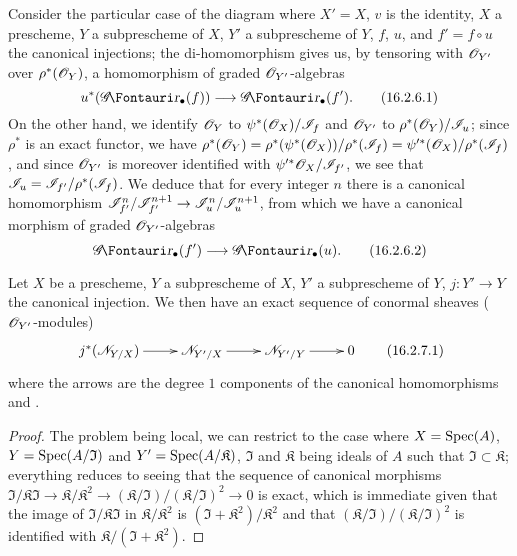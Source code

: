 \begin{env}[16.2.6]
\label{IV.16.2.6}
Consider the particular case of the diagram  where $X' = X$, $v$ is the identity, $X$ a prescheme, $Y$ a subprescheme of $X$, $Y'$ a subprescheme of $Y$, $f$, $u$, and $f' = f \circ u$ the canonical injections;
the di-homomorphism  gives us, by tensoring with $\mathscr{O}_{Y'}$ over $\rho^*(\mathscr{O}_Y)$, a homomorphism of graded $\mathscr{O}_{Y'}$-algebras
\[
  \label{IV.16.2.6.1}
  u^*(\shGr_\bullet(f)) \to \shGr_\bullet(f').
  \tag{16.2.6.1}
\]
On the other hand, we identify $\mathscr{O}_Y$ to $\psi^*(\mathscr{O}_X)/\mathscr{I}_f$ and $\mathscr{O}_{Y'}$ to $\rho^*(\mathscr{O}_Y)/\mathscr{I}_u$;
since $\rho^*$ is an exact functor, we have $\rho^*(\mathscr{O}_Y) = \rho^*(\psi^*(\mathscr{O}_X))/\rho^*(\mathscr{I}_f) = \psi'^*(\mathscr{O}_X)/\rho^*(\mathscr{I}_f)$, and since $\mathscr{O}_{Y'}$ is moreover identified with $\psi'^*{\mathscr{O}_X}/\mathscr{I}_{f'}$, we see that $\mathscr{I}_u = \mathscr{I}_{f'}/\rho^*(\mathscr{I}_f)$.
We deduce that for every integer $n$ there is a canonical homomorphism $\sh{I}_{f'}^n/\sh{I}_{f'}^{n+1} \to \sh{I}_{u}^n/\sh{I}_{u}^{n+1}$, from which we have a canonical morphism of graded $\mathscr{O}_{Y'}$-algebras
\[
  \label{IV.16.2.6.2}
  \shGr_\bullet(f') \to \shGr_\bullet(u).
  \tag{16.2.6.2}
\]
\end{env}

\begin{proposition}[16.2.7]
\label{IV.16.2.7}
Let $X$ be a prescheme, $Y$ a subprescheme of $X$, $Y'$ a subprescheme of $Y$, $j:Y' \to Y$ the canonical injection.
We then have an exact sequence of conormal sheaves ($\mathscr{O}_{Y'}$-modules)
\[
  \label{IV.16.2.7.1}
  \xymatrix{
    j^*(\sh{N}_{Y/X}) \ar[r] & \sh{N}_{Y'/X} \ar[r] & \sh{N}_{Y'/Y} \ar[r] & 0
  }
  \tag{16.2.7.1}
\]
where the arrows are the degree $1$ components of the canonical homomorphisms  and .
\end{proposition}

\begin{proof}
The problem being local, we can restrict to the case where $X = \operatorname{Spec}(A)$, $Y = \operatorname{Spec}(A/\mathfrak{I})$ and $Y' = \operatorname{Spec}(A/\mathfrak{K})$, $\mathfrak{I}$ and $\mathfrak{K}$ being ideals of $A$ such that $\mathfrak{I} \subset \mathfrak{K}$;
everything reduces to seeing 
that the sequence of canonical morphisms $\mathfrak{I}/\mathfrak{K}\mathfrak{I} \to \mathfrak{K}/\mathfrak{K}^2 \to (\mathfrak{K}/\mathfrak{I})/(\mathfrak{K}/\mathfrak{I})^2 \to 0$ is exact, which is immediate given that the image of $\mathfrak{I}/\mathfrak{K}\mathfrak{I}$ in $\mathfrak{K}/\mathfrak{K}^2$ is $(\mathfrak{I} + \mathfrak{K}^2)/\mathfrak{K}^2$ and that $(\mathfrak{K}/\mathfrak{I})/(\mathfrak{K}/\mathfrak{I})^2$ is identified with $\mathfrak{K}/(\mathfrak{I} + \mathfrak{K}^2)$.
\end{proof}

